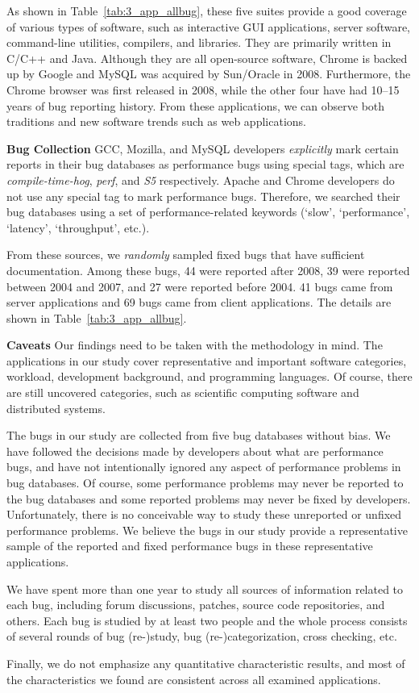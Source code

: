 As shown in Table~\ref{tab:3_app_allbug},
these five suites provide a good coverage of various types of software, 
such as interactive GUI 
applications, server software, command-line utilities, compilers,
and libraries.
They are primarily written in C/C++ and Java. 
Although they are all open-source software, Chrome is 
backed up by Google
and MySQL was acquired by Sun/Oracle in 2008.
Furthermore, the Chrome browser was first released
in 2008, while the other four
have had 10--15 years of bug reporting history.
From these applications, we can observe both traditions and new software
trends such as web applications.

{\bf Bug Collection}
GCC, Mozilla, and MySQL developers {\it explicitly} mark certain reports in
their bug databases as performance bugs using special tags, which are 
{\it compile-time-hog}, {\it perf}, and {\it S5} respectively.
Apache and Chrome developers do not use any special tag to mark performance 
bugs. Therefore, we searched their bug databases using
a set of performance-related keywords 
(`slow', `performance', `latency', 
`throughput', etc.).

From these sources, we {\it randomly} sampled \allbugs fixed bugs that
have sufficient documentation.
Among these bugs, 44 were reported after 2008, 39 were
reported between 2004 and 2007, and 27 were reported before 2004.
41 bugs came from server applications and 69 bugs came
from client applications. 
The details are shown in Table~\ref{tab:3_app_allbug}.


{\bf Caveats}
Our findings need to be taken with the methodology in mind. 
The applications in our study cover representative and important software 
categories, workload, development background, and programming languages.
Of course, there are still uncovered categories, such as scientific
computing software and distributed systems.

The bugs in our study are collected from five bug databases without bias. 
We have followed the decisions made by developers about what are performance 
bugs,
and have not intentionally ignored any aspect of performance problems in bug
databases. Of course, some
performance problems may never be reported to the bug databases and some 
reported problems may never be fixed by developers.
Unfortunately, there is no conceivable way to study these unreported or
unfixed performance problems.
We believe the bugs in our study provide a representative sample of 
the reported and fixed performance bugs in these representative applications. 

We have spent more than one year to study all sources of information related
to each bug, including forum discussions, patches, source code repositories, 
and others. Each bug is studied by at least two people and
the whole process consists of several rounds of bug (re-)study, 
bug (re-)categorization, cross checking, etc. 

Finally, we do not emphasize any quantitative characteristic results, and
most of the characteristics we found are consistent across
all examined applications.
